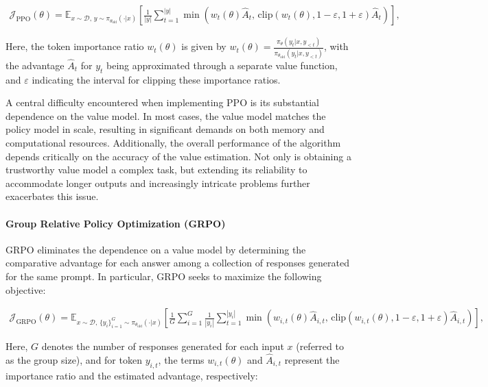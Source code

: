 \begin{align}
\mathcal{J}_\text{PPO}(\theta) = \mathbb{E}_{ x \sim \mathcal{D},\, y \sim \pi_{\theta_\text{old}}( \cdot | x) }
\left[ \frac{1}{|y|} \sum_{t=1}^{|y|} 
\min \left( w_{t}(\theta) \widehat{A}_{t},  \, \mathrm{clip} \left( w_{t}(\theta), 1 - {\varepsilon}, 1 + {\varepsilon}\right) \widehat{A}_{t} \right)
\right],
\end{align}

Here, the token importance ratio $w_{t}(\theta)$ is given by $
w_{t}(\theta) = \frac{ \pi_{\theta} (y_{t} | x, y_{<t}) }{ \pi_{\theta_\text{old}} (y_{t} | x, y_{<t})} $, with the advantage $\widehat{A}_{t}$ for $y_t$ being approximated through a separate value function, and $\varepsilon$ indicating the interval for clipping these importance ratios.

A central difficulty encountered when implementing PPO is its substantial dependence on the value model. In most cases, the value model matches the policy model in scale, resulting in significant demands on both memory and computational resources. Additionally, the overall performance of the algorithm depends critically on the accuracy of the value estimation. Not only is obtaining a trustworthy value model a complex task, but extending its reliability to accommodate longer outputs and increasingly intricate problems further exacerbates this issue.

\paragraph{Group Relative Policy Optimization (GRPO)} GRPO \citep{grpo} eliminates the dependence on a value model by determining the comparative advantage for each answer among a collection of responses generated for the same prompt. In particular, GRPO seeks to maximize the following objective:

\begin{align}
\label{equ:grpo}
\mathcal{J}_\text{GRPO}(\theta) = \mathbb{E}_{ x \sim \mathcal{D},\, \{y_i\}_{i=1}^G \sim \pi_{\theta_\text{old}}( \cdot | x) }
\left[ \frac{1}{G} \sum_{i=1}^{G} \frac{1}{|y_i|} \sum_{t=1}^{|y_i|} 
\min \left( w_{i,t}(\theta) \widehat{A}_{i,t},  \, \mathrm{clip} \left( w_{i,t}(\theta), 1 - {\varepsilon}, 1 + {\varepsilon}\right) \widehat{A}_{i,t} \right)
\right],
\end{align}

Here, $G$ denotes the number of responses generated for each input $x$ (referred to as the group size), and for token $y_{i,t}$, the terms $w_{i,t}(\theta)$ and $\widehat{A}_{i,t}$ represent the importance ratio and the estimated advantage, respectively:

